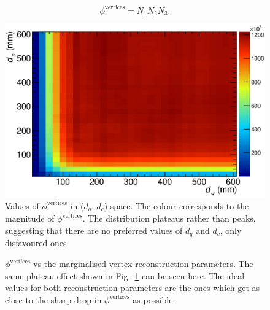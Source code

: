 \begin{equation}
  \phi^{\textrm{vertices}} = N_1N_2N_3.
\end{equation}
\begin{figure}
  \centering
  \includegraphics[width=12cm]{images/selection/vertex_recon/FOM_2D}
  \caption{Values of $\phi^{\textrm{vertices}}$ in ($d_q$, $d_c$) space.  The colour corresponds to the magnitude of $\phi^{\textrm{vertices}}$.  The distribution plateaus rather than peaks, suggesting that there are no preferred values of $d_q$ and $d_c$, only disfavoured ones.}
  \label{fig:VertexReconFOM}
\end{figure}
\begin{figure}
  \centering
  \caption{$\phi^{\textrm{vertices}}$ vs the marginalised vertex reconstruction parameters.  The same plateau effect shown in Fig.~\ref{fig:VertexReconFOM} can be seen here.  The ideal values for both reconstruction parameters are the ones which get as close to the sharp drop in $\phi^{\textrm{vertices}}$ as possible.}
  \label{fig:VertexReconMarginalizedDistributions}
\end{figure}
